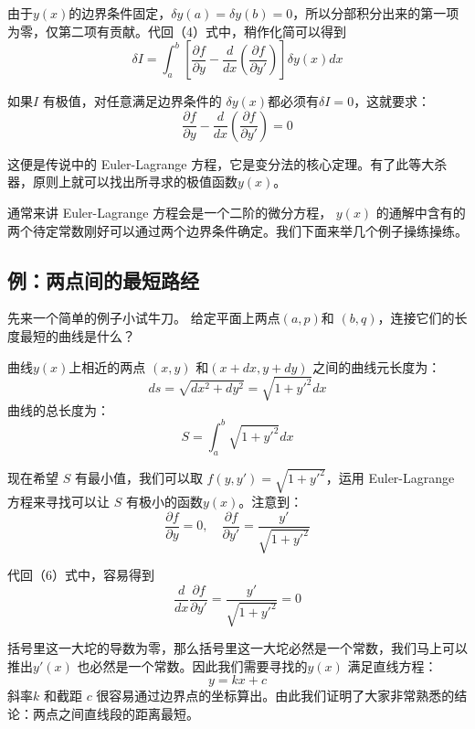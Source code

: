 \documentclass[12pt]{article}
\begin{document}
由于$y(x)$的边界条件固定，$\delta y(a) = \delta y(b) = 0$，所以分部积分出来的第一项为零，仅第二项有贡献。代回（4）式中，稍作化简可以得到
\begin{equation}
    \delta I = \int_a^b[\frac{\partial f}{\partial y} - \frac{d}{dx} (\frac{\partial f}{\partial y'})]\delta y(x)dx
\end{equation}

如果$I$ 有极值，对任意满足边界条件的 $\delta y(x)$都必须有$\delta I = 0$，这就要求：
\begin{equation}
   \frac{\partial f}{\partial y} - \frac{d}{dx} (\frac{\partial f}{\partial y'}) = 0
\end{equation}

这便是传说中的 Euler-Lagrange 方程，它是变分法的核心定理。有了此等大杀器，原则上就可以找出所寻求的极值函数$y(x)$。

通常来讲 Euler-Lagrange 方程会是一个二阶的微分方程， $y(x)$ 的通解中含有的两个待定常数刚好可以通过两个边界条件确定。我们下面来举几个例子操练操练。

\subsection{例：两点间的最短路经}
先来一个简单的例子小试牛刀。
给定平面上两点$(a,p)$和 $(b,q)$，连接它们的长度最短的曲线是什么？

曲线$y(x)$上相近的两点 $(x,y)$ 和$(x+dx,y+dy)$ 之间的曲线元长度为：
\begin{equation}
   ds = \sqrt{dx^2+dy^2} = \sqrt{1+y'^2}dx
\end{equation}
曲线的总长度为：
\begin{equation}
   S = \int_a^b{\sqrt{1+y'^2}}dx
\end{equation}

现在希望 $S$ 有最小值，我们可以取 $f(y,y') = \sqrt{1+y'^2}$，运用 Euler-Lagrange 方程来寻找可以让 $S$ 有极小的函数$y(x)$。注意到：
\begin{equation}
   \frac{\partial f}{\partial y} = 0, \quad \frac{\partial f}{\partial y'} = \frac{y'}{\sqrt{1+y'^2}}
\end{equation}

代回（6）式中，容易得到
\begin{equation}
    \frac{d}{dx}\frac{\partial f}{\partial y'} = \frac{y'}{\sqrt{1+y'^2}} = 0
\end{equation}

括号里这一大坨的导数为零，那么括号里这一大坨必然是一个常数，我们马上可以推出$y'(x)$ 也必然是一个常数。因此我们需要寻找的$y(x)$ 满足直线方程：
\begin{equation}
    y = kx + c
\end{equation}
斜率$k$ 和截距 $c$ 很容易通过边界点的坐标算出。由此我们证明了大家非常熟悉的结论：两点之间直线段的距离最短。
\end{document}
